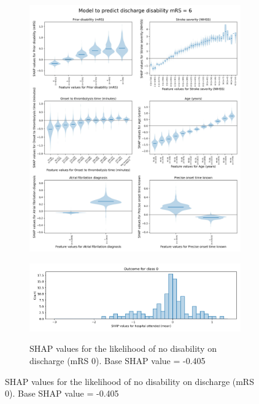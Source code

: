 \begin{figure}[h]
\begin{subfigure}{.5\textwidth}
    \end{subfigure}%
    \begin{subfigure}{.5\textwidth}
      \centering
      \captionsetup{width=.9\linewidth}
      \includegraphics[trim={0 0 0 1.2cm}, clip, width=0.95\linewidth]      {./images/053_xgb_7_features_1fold_thrombolysis_shap_violin_all_features_for_mRS6}\\
    \end{subfigure}
    \hfill
    \begin{subfigure}{.5\textwidth}
      \centering
      \captionsetup{width=.9\linewidth}
      \includegraphics[trim={0 0 0 1cm}, clip, width=1\linewidth]    {./images/053_xgb_7_features_1fold_hosp_shap_hist_mrs0}\\
      \caption{\footnotesize{SHAP values for the likelihood of no disability on discharge (mRS 0). Base SHAP value = -0.405}}

\end{subfigure}
\end{figure}
